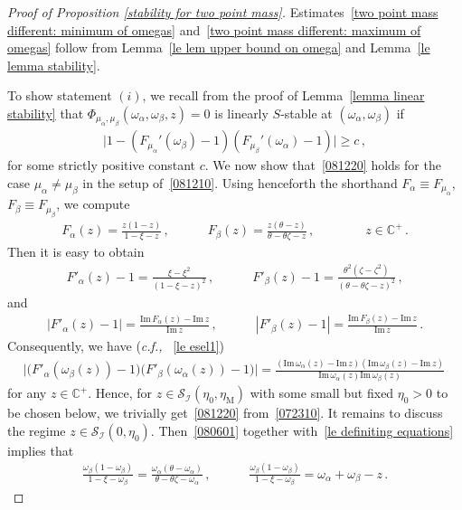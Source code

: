 \documentclass[10pt,reqno]{amsart}
\numberwithin{equation}{section}
\theoremstyle{plain}
\numberwithin{kevin}{section}
\theoremstyle{remark}
\renewcommand{\Im}{\mathrm{Im}\,}
\newcommand{\im}{\mathrm{Im}\,}
\newcommand{\C}{{\mathbb C}}
\newcommand{\cf}{\emph{c.f., }}
\newcommand{\PP}{\Phi}
\begin{document}
\begin{proof}[Proof of Proposition \ref{stability for two point mass}] Estimates~\eqref{two point mass different: minimum of omegas} and~\eqref{two point mass different: maximum of omegas} follow from Lemma~\ref{le lem upper bound on omega} and Lemma~\ref{le lemma stability}. 

To show statement $(i)$, we recall from the proof of Lemma~\ref{lemma linear stability} that $\PP_{\mu_\alpha,\mu_\beta}(\omega_\alpha,\omega_\beta,z)=0$ is linearly $S$-stable at $(\omega_\alpha,\omega_\beta)$ if
\begin{align}
\big|1-(F_{\mu_\alpha}'(\omega_\beta)-1) (F_{\mu_\beta}'(\omega_\alpha)-1) \big|\geq c\,, \label{081220}
\end{align}
for some strictly positive constant $c$. We now show that~\eqref{081220} holds for the case $\mu_\alpha\neq\mu_\beta$ in the setup of~\eqref{081210}. Using henceforth the shorthand $F_{\alpha}\equiv F_{\mu_\alpha}$, $F_{\beta}\equiv F_{\mu_\beta}$, we compute
\begin{align}
F_\alpha(z)=\frac{z(1-z)}{1-\xi-z}\,,\qquad\quad F_\beta(z)=\frac{z(\theta-z)}{\theta-\theta \zeta-z}\,,\qquad\qquad z\in\C^+\,. \label{080601}
\end{align}
Then it is easy to obtain
\begin{align}
F'_\alpha(z)-1=\frac{\xi-\xi^2}{(1-\xi-z)^2}\,,\qquad\quad F'_\beta(z)-1=\frac{\theta^2(\zeta-\zeta^2)}{(\theta-\theta \zeta-z)^2}\,, \label{072303}
\end{align}
and
\begin{align*}
|F'_\alpha(z)-1|=\frac{\Im F_\alpha(z)-\Im z}{\Im z}\,,\qquad\quad |F'_\beta(z)-1|=\frac{\Im F_\beta(z)-\Im z}{\Im z}\,.
\end{align*}
Consequently, we have (\cf~\eqref{le esel1})
\begin{align}
\Big|\big(F'_\alpha(\omega_\beta(z))-1\big)\big( F'_\beta(\omega_\alpha(z))-1\big)\Big|=\frac{(\Im\omega_\alpha(z)-\im z)(\Im \omega_\beta(z)-\im z)}{\Im\omega_\alpha(z)\Im \omega_\beta(z)}\, \label{072310}
\end{align}
for any $z\in\C^+$. Hence, for $z\in \mathcal{S}_{\mathcal{I}}(\eta_0, \eta_{\mathrm{M}})$ with some small but fixed $\eta_0>0$ to be chosen below, we trivially get~\eqref{081220} from~\eqref{072310}. It remains to discuss the regime $z\in \mathcal{S}_{\mathcal{I}}(0, \eta_0)$. Then~\eqref{080601} together with~\eqref{le definiting equations} implies that
\begin{align}
\frac{\omega_\beta(1-\omega_\beta)}{1-\xi-\omega_\beta}=\frac{\omega_\alpha(\theta-\omega_\alpha)}{\theta-\theta \zeta-\omega_\alpha}\,,\qquad \quad\frac{\omega_\beta(1-\omega_\beta)}{1-\xi-\omega_\beta}=\omega_\alpha+\omega_\beta-z\,. \label{07220111}

\end{align}
\end{proof}
\end{document}
